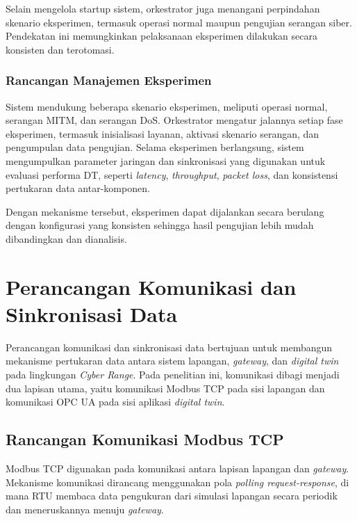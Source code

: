 Selain mengelola startup sistem, orkestrator juga menangani perpindahan skenario eksperimen, termasuk operasi normal maupun pengujian serangan siber. Pendekatan ini memungkinkan pelaksanaan eksperimen dilakukan secara konsisten dan terotomasi.

\subsubsection{Rancangan Manajemen Eksperimen}
\label{subsubsec:rancangan_manajemen_eksperimen}
Sistem mendukung beberapa skenario eksperimen, meliputi operasi normal, serangan \ac{MITM}, dan serangan \ac{DoS}. Orkestrator mengatur jalannya setiap fase eksperimen, termasuk inisialisasi layanan, aktivasi skenario serangan, dan pengumpulan data pengujian. Selama eksperimen berlangsung, sistem mengumpulkan parameter jaringan dan sinkronisasi yang digunakan untuk evaluasi performa \ac{DT}, seperti \textit{latency}, \textit{throughput}, \textit{packet loss}, dan konsistensi pertukaran data antar-komponen.

Dengan mekanisme tersebut, eksperimen dapat dijalankan secara berulang dengan konfigurasi yang konsisten sehingga hasil pengujian lebih mudah dibandingkan dan dianalisis.

\section{Perancangan Komunikasi dan Sinkronisasi Data}
\label{sec:rancangan_infrastruktur_komunikasi}
Perancangan komunikasi dan sinkronisasi data bertujuan untuk membangun mekanisme pertukaran data antara sistem lapangan, \textit{gateway}, dan \textit{digital twin} pada lingkungan \textit{Cyber Range}. Pada penelitian ini, komunikasi dibagi menjadi dua lapisan utama, yaitu komunikasi Modbus TCP pada sisi lapangan dan komunikasi OPC UA pada sisi aplikasi \textit{digital twin}.

\subsection{Rancangan Komunikasi Modbus TCP}
\label{subsec:rancangan_komunikasi_modbus_tcp}
Modbus TCP digunakan pada komunikasi antara lapisan lapangan dan \textit{gateway}. Mekanisme komunikasi dirancang menggunakan pola \textit{polling request-response}, di mana RTU membaca data pengukuran dari simulasi lapangan secara periodik dan meneruskannya menuju \textit{gateway}.

